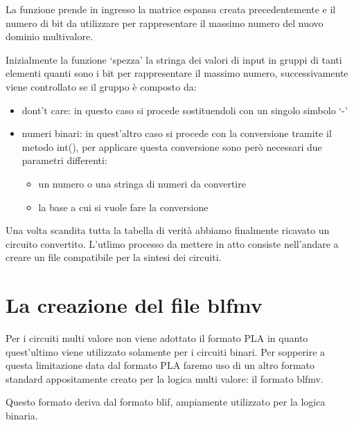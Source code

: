 \documentclass[italian,]{book}
\providecommand{\tightlist}{%
  \setlength{\itemsep}{0pt}\setlength{\parskip}{0pt}}
\begin{document}
La funzione prende in ingresso la matrice espansa creata precedentemente e il numero di bit da utilizzare per rappresentare il massimo numero del nuovo dominio multivalore.

\newpage

Inizialmente la funzione `spezza' la stringa dei valori di input in gruppi di tanti elementi quanti sono i bit per rappresentare il massimo numero, successivamente viene controllato se il gruppo è composto da:

\begin{itemize}
\tightlist
\item
  dont't care: in questo caso si procede sostituendoli con un singolo simbolo `-'
\item
  numeri binari: in quest'altro caso si procede con la conversione tramite il metodo int(), per applicare questa conversione sono però necessari due parametri differenti:

  \begin{itemize}
  \tightlist
  \item
    un numero o una stringa di numeri da convertire
  \item
    la base a cui si vuole fare la conversione
  \end{itemize}
\end{itemize}

Una volta scandita tutta la tabella di verità abbiamo finalmente ricavato un circuito convertito. L'utlimo processo da mettere in atto consiste nell'andare a creare un file compatibile per la sintesi dei circuiti.

\hypertarget{la-creazione-del-file-blfmv}{%
\section{La creazione del file blfmv}\label{la-creazione-del-file-blfmv}}

Per i circuiti multi valore non viene adottato il formato PLA in quanto quest'ultimo viene utilizzato solamente per i circuiti binari. Per sopperire a questa limitazione data dal formato PLA faremo uso di un altro formato standard appositamente creato per la logica multi valore: il formato blfmv.

Questo formato deriva dal formato blif, ampiamente utilizzato per la logica binaria.
\end{document}

